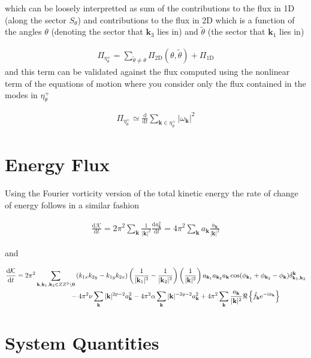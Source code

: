 \documentclass[9pt]{article}
\newcommand{\der}[2]{\frac{\mathrm{d}#1}{\mathrm{d}#2}}          	 %
\newcommand{\ii}{\mathrm{i}}      								  %
\newcommand{\e}{\mathrm{e}}      								  %
\newcommand{\bfk}{\mathbf{k}}								%
\newcommand{\bfkn}[1]{\mathbf{k}_{#1}}								%
\begin{document}
which can be loosely interpretted as sum of the contributions to the flux in 1D (along the sector $S_\theta$) and contributions to the flux in 2D which is a function of the angles $\theta$ (denoting the sector that $\bfkn{3}$ lies in) and $\tilde{\theta}$ (the sector that $\bfkn{1}$ lies in)
	
\begin{align}
	\Pi_{\eta_{\theta}^{+}} = \sum_{\tilde{\theta} \neq \theta} \Pi_{\text{2D}}(\theta, \tilde{\theta}) + \Pi_{\text{1D}}
\end{align}
and this term can be validated against the flux computed using the nonlinear term of the equations of motion where you consider only the flux contained in the modes in $\eta_{\theta}^{+}$

\begin{align}
	\Pi_{\eta_{\theta}^{+}} \simeq \der{}{t} \sum_{\bfk \in \eta_{\theta}^{+}} |\omega_{\bfk}|^2
\end{align}

\section{Energy Flux}

Using the Fourier vorticity version of the total kinetic energy the rate of change of energy follows in a similar fashion

\begin{align}
	\der{\mathcal{K}}{t} = 2\pi^2\sum_{\bfk}  \frac{1}{|\bfk|^2}\der{a_\bfk^2}{t} =4\pi^2\sum_{\bfk} a_\bfk \frac{\dot{a}_\bfk}{|\bfk|^2}
\end{align}

and 

\begin{align}
	\der{\mathcal{K}}{t} &= 2\pi^2	\sum_{\bfk, \mathbf{k}_1, \mathbf{k}_2\in \mathbb{Z}^2\setminus \mathbf{0}}\left(k_{1x}k_{2y} - k_{1y}k_{2x}\right) \left(\frac{1}{|\bfkn{1}|^2} - \frac{1}{|\bfkn{2}|^2}\right) \left( \frac{1}{|\bfk|^2}\right)a_{\bfkn{1}} a_{\bfkn{2}} a_{\bfk} \cos(\phi_{\bfkn{1}} + \phi_{\bfkn{2}} - \phi_{\bfk})\delta_{\bfkn{1}, \bfkn{2}}^{\bfk} \notag \\ & \qquad \qquad \qquad \qquad- 4\pi^2\nu \sum_{\bfk}|\bfk|^{2p - 2} a_{\bfk}^2 - 4\pi^2\alpha\sum_{\bfk}|\bfk|^{-2q - 2} a_\bfk^2 + 4\pi^2\sum_{\bfk}\frac{a_\bfk}{|\bfk|^2}\Re\left\{\hat{f}_{\bfk} \e^{-\ii\phi_\bfk}\right\}
\end{align}

\section{System Quantities}
\end{document}
